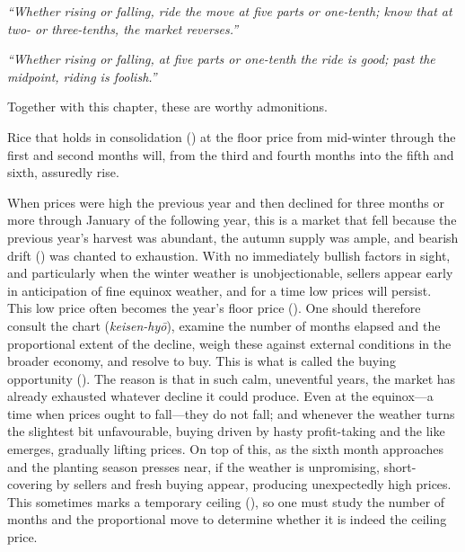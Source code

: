 \textit{``Whether rising or falling, ride the move at five parts or
one-tenth; know that at two- or three-tenths, the market reverses.''}

\textit{``Whether rising or falling, at five parts or one-tenth the ride
is good; past the midpoint, riding is foolish.''}

Together with this chapter, these are worthy admonitions.


\begin{sokyubox}
{\small\itshape\color{sokyubar} }

\medskip
Rice that holds in consolidation () at the floor price
from mid-winter through the first and second months will, from the third
and fourth months into the fifth and sixth, assuredly rise.
\end{sokyubox}

\commentary
When prices were high the previous year and then declined for three
months or more through January of the following year, this is a market
that fell because the previous year's harvest was abundant, the autumn
supply was ample, and bearish drift () was
chanted to exhaustion. With no immediately bullish factors in sight, and
particularly when the winter weather is unobjectionable, sellers appear
early in anticipation of fine equinox weather, and for a time low prices
will persist. This low price often becomes the year's floor price
(). One should therefore consult the chart
(\textit{keisen-hy\=o}), examine the number of months elapsed and the
proportional extent of the decline, weigh these against external
conditions in the broader economy, and resolve to buy. This is what is
called the buying opportunity (). The reason is
that in such calm, uneventful years, the market has already exhausted
whatever decline it could produce. Even at the equinox---a time when
prices ought to fall---they do not fall; and whenever the weather turns
the slightest bit unfavourable, buying driven by hasty profit-taking and
the like emerges, gradually lifting prices. On top of this, as the sixth
month approaches and the planting season presses near, if the weather is
unpromising, short-covering by sellers and fresh buying appear, producing
unexpectedly high prices. This sometimes marks a temporary ceiling
(), so one must study the number of months
and the proportional move to determine whether it is indeed the ceiling
price.


